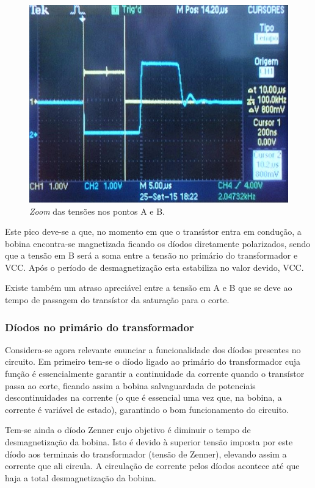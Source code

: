 \documentclass[a4paper,11pt]{article}
\numberwithin{equation}{section}
\begin{document}
\begin{figure}[h]
	\centering
	\includegraphics[keepaspectratio=true, scale=0.6]{img/fig5}
	\caption{\textit{Zoom} das tensões nos pontos A e B.}
	\label{fig:photo 2}
	\vspace{-0.8em}
\end{figure}

Este pico deve-se a que, no momento em que o transístor entra em condução, a bobina encontra-se magnetizada ficando os díodos diretamente polarizados, sendo que a tensão em B será a soma entre a tensão no primário do transformador e VCC. Após o período de desmagnetização esta estabiliza no valor devido, VCC. 

Existe também um atraso apreciável entre a tensão em A e B que se deve ao tempo de passagem do transístor da saturação para o corte.

\subsubsection{Díodos no primário do transformador}

Considera-se agora relevante enunciar a funcionalidade dos díodos presentes no circuito. Em primeiro tem-se o díodo ligado ao primário do transformador cuja função é essencialmente garantir a continuidade da corrente quando o transístor passa ao corte, ficando assim a bobina salvaguardada de potenciais descontinuidades na corrente (o que é essencial uma vez que, na bobina, a corrente é variável de estado), garantindo o bom funcionamento do circuito. 

Tem-se ainda o díodo Zenner cujo objetivo é diminuir o tempo de desmagnetização da bobina. Isto é devido à superior tensão imposta por este díodo aos terminais do transformador (tensão de Zenner), elevando assim a corrente que ali circula. A circulação de corrente pelos díodos acontece até que haja a total desmagnetização da
bobina.
\end{document}
